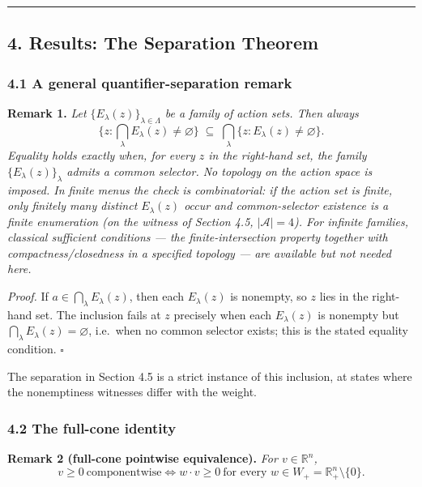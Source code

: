 \documentclass[11pt]{article}
\begin{document}
\begin{center}\rule{0.5\linewidth}{0.5pt}\end{center}

\subsection{4. Results: The Separation
Theorem}\label{results-the-separation-theorem}

\subsubsection{4.1 A general quantifier-separation
remark}\label{a-general-quantifier-separation-remark}

\textbf{Remark 1.} \emph{Let \(\{E_\lambda(z)\}_{\lambda \in \Lambda}\)
be a family of action sets. Then always}
\[\Big\{ z : \textstyle\bigcap_{\lambda} E_\lambda(z) \neq \varnothing \Big\} \;\subseteq\; \bigcap_{\lambda} \big\{ z : E_\lambda(z) \neq \varnothing \big\}.\]
\emph{Equality holds exactly when, for every \(z\) in the right-hand
set, the family \(\{E_\lambda(z)\}_\lambda\) admits a common selector.
No topology on the action space is imposed. In finite menus the check is
combinatorial: if the action set is finite, only finitely many distinct
\(E_\lambda(z)\) occur and common-selector existence is a finite
enumeration (on the witness of Section 4.5, \(|\mathcal{A}| = 4\)). For
infinite families, classical sufficient conditions --- the
finite-intersection property together with compactness/closedness in a specified topology --- are available but not needed here.}

\emph{Proof.} If \(a \in \bigcap_\lambda E_\lambda(z)\), then each
\(E_\lambda(z)\) is nonempty, so \(z\) lies in the right-hand set. The
inclusion fails at \(z\) precisely when each \(E_\lambda(z)\) is
nonempty but \(\bigcap_\lambda E_\lambda(z) = \varnothing\), i.e.~when
no common selector exists; this is the stated equality condition. \ensuremath{\square}

The separation in Section 4.5 is a strict instance of this inclusion, at states where the nonemptiness witnesses differ with the weight.

\subsubsection{4.2 The full-cone identity}\label{the-full-cone-identity}

\textbf{Remark 2 (full-cone pointwise equivalence).} \emph{For
\(v \in \mathbb{R}^n\),}
\[v \ge 0 \ \text{componentwise} \iff w \cdot v \ge 0 \ \text{for every } w \in W_+ = \mathbb{R}^n_+ \setminus \{0\}.\]
\end{document}

